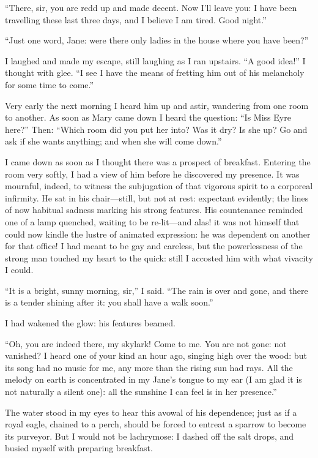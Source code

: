 \enquote{There, sir, you are redd up and made decent. Now I'll leave
you: I have been travelling these last three days, and I believe I am
tired. Good night.}

\enquote{Just one word, Jane: were there only ladies in the house where
you have been?}

I laughed and made my escape, still laughing as I ran upstairs. 
\enquote{A good idea!} I thought with glee. \enquote{I see I have the
means of fretting him out of his melancholy for some time to come.}

Very early the next morning I heard him up and astir, wandering from one
room to another. As soon as Mary came down I heard the question:
\enquote{Is Miss Eyre here?} Then: \enquote{Which room did you put her
into? Was it dry? Is she up? Go and ask if she wants anything; and
when she will come down.}

I came down as soon as I thought there was a prospect of breakfast. 
Entering the room very softly, I had a view of him before he discovered
my presence. It was mournful, indeed, to witness the subjugation of
that vigorous spirit to a corporeal infirmity. He sat in his
chair---still, but not at rest: expectant evidently; the lines of now
habitual sadness marking his strong features. His countenance reminded
one of a lamp quenched, waiting to be re-lit---and alas! it was not
himself that could now kindle the lustre of animated expression: he was
dependent on another for that office! I had meant to be gay and
careless, but the powerlessness of the strong man touched my heart to
the quick: still I accosted him with what vivacity I could.

\enquote{It is a bright, sunny morning, sir,} I said. \enquote{The rain
is over and gone, and there is a tender shining after it: you shall have
a walk soon.}

I had wakened the glow: his features beamed.

\enquote{Oh, you are indeed there, my skylark! Come to me. You are not
gone: not vanished? I heard one of your kind an hour ago, singing high
over the wood: but its song had no music for me, any more than the
rising sun had rays. All the melody on earth is concentrated in my
Jane's tongue to my ear (I am glad it is not naturally a silent one):
all the sunshine I can feel is in her presence.}

The water stood in my eyes to hear this avowal of his dependence; just
as if a royal eagle, chained to a perch, should be forced to entreat a
sparrow to become its purveyor. But I would not be lachrymose: I dashed
off the salt drops, and busied myself with preparing breakfast.

